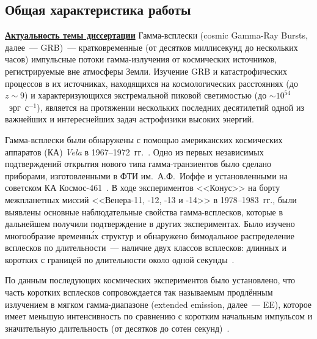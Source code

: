 \subsection*{\Large Общая характеристика работы}
\fontsize{14pt}{15pt}\selectfont
\underline{\textbf{Актуальность темы диссертации}}
Гамма-всплески (cosmic Gamma-Ray Bursts, далее~--- GRB)~--- кратковременные 
(от десятков миллисекунд до нескольких часов) импульсные потоки гамма-излучения  
от космических источников, регистрируемые вне атмосферы Земли. 
Изучение GRB и катастрофических процессов в их  источниках, находящихся на 
космологических расстояниях (до $z\sim9$) и характеризующихся экстремальной пиковой 
светимостью (до $\sim 10^{54}$~эрг~с$^{-1}$), является на протяжении нескольких 
последних десятилетий одной из важнейших и интереснейших задач астрофизики высоких энергий.

Гамма-всплески были обнаружены с помощью американских космических 
аппаратов (КА) \textit{Vela} в 1967--1972~гг.~\citep{Klebesadel_1973ApJ}. 
Одно из первых независимых подтверждений открытия нового типа гамма-транзиентов 
было сделано приборами, изготовленными в ФТИ им.~А.Ф.~Иоффе и установленными 
на советском КА Космос-461~\citep{Mazets_1974PZETF_ru}. В ходе экспериментов <<Конус>> 
на борту межпланетных миссий <<Венера-11, -12, -13 и -14>> в 1978--1983~гг., были выявлены
основные наблюдательные свойства гамма-всплесков, которые в дальнейшем получили 
подтверждение в других экспериментах. Было изучено многообразие временн\'{ы}х структур
и обнаружено бимодальное распределение всплесков по длительности~--- 
наличие двух классов всплесков: длинных и коротких с границей по длительности 
около одной секунды~\citep{Mazets_1981_part_1}.

По данным последующих космических экспериментов было установлено, что часть коротких всплесков
сопровождается так называемым продлённым излучением в мягком гамма-диапазоне 
(extended emission, далее~--- EE), которое имеет меньшую интенсивность 
по сравнению с коротким начальным импульсом и значительную длительность 
(от десятков до сотен секунд)~\citep{Burenin_2000AstL,Frederiks_2004ASPC,Norris_and_Bonnel_2006ApJ}.

